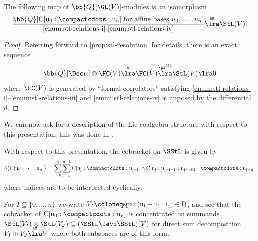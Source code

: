 \documentclass[a4paper]{amsart}
\begin{document}
\begin{proposition}\label{prop:stl-explicit-pres}The following map of $\bb{Q}[\GL(V)]$-modules is an isomorphism
\[\frac{\bb{Q}[\rm{C}[u_0:\compactcdots:u_n] \text{ for affine bases $u_0,\ldots,u_n$}]}{\text{\eqref{enum:stl-relations-i}-\eqref{enum:stl-relations-iv}}} \overset{\cong}\lra \StL(V).\]
\end{proposition}

\begin{proof}Referring forward to \cref{prop:stl-resolution} for details, there is an exact sequence
\[\bb{Q}[\Dec_V] \otimes \FC(V) \overset{d}{\lra} \FC(V) \overset{\pr^\FC} \lra \StL(V) \lra 0\]
where $\FC(V)$ is generated by ``formal correlators'' satisfying \eqref{enum:stl-relations-i}--\eqref{enum:stl-relations-iii} and \eqref{enum:stl-relations-iv} is imposed by the differential $d$.
\end{proof}

We can now ask for a description of the Lie coalgebra structure with respect to this presentation: this was done in \cite[Section 3.8]{CharltonRadchenkoRudenko}.

\begin{proposition}\label{prop:stl-explicit-cobracket} With respect to this presentation, the cobracket on $\SStL$ is given by
\begin{equation}\label{eqn:stinfty-cobracket}
\delta\big(\rm{C}[u_0:\cdots:u_n]\big) = \sum_{j=0}^n \sum_{i=1}^{n-1} \rm{C}[u_j:\compactcdots:u_{j+i}] \wedge \rm{C}[u_j:u_{j+i+1}:u_{j+i+2}:\compactcdots:u_{j+n}]\end{equation}
where indices are to be interpreted cyclically.
\end{proposition}

For $I \subseteq \{0,\ldots,n\}$ we write $V_I \coloneq \rm{span}(u_i-u_j \mid i,j \in I)$, and see that the cobracket of $\rm{C}[u_0:\compactcdots:u_n]$ is concentrated on summands $\StL(V_I) \otimes \StL(V_J) \subseteq (\SStL \levi \SStL)(V)$ for direct sum decomposition $V_I \oplus V_J \smash{\overset{\cong}\lra} V$ where both subspaces are of this form.
\end{document}
